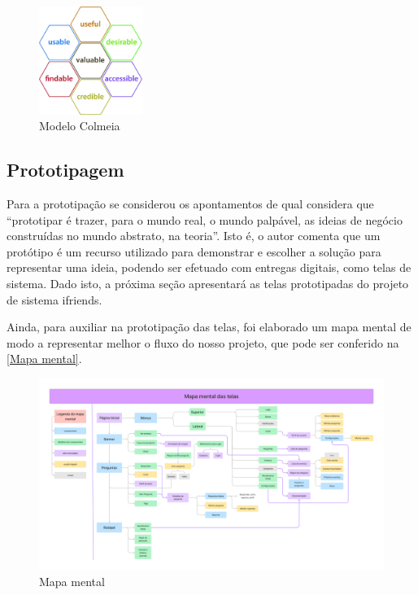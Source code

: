 \begin{figure}[htb]
\centering
\caption{\label{modelo colmeia} Modelo Colmeia}
\includegraphics[width=0.3\textwidth]{anexos/Imagens_Proposta/modelo_colmeia.jpg}
\end{figure}
\FloatBarrier

\subsection{Prototipagem}
Para a prototipação se considerou os apontamentos de  qual considera que ``prototipar é trazer, para o mundo real, o mundo palpável, as ideias de negócio construídas no mundo abstrato, na teoria''. Isto é, o autor comenta que um protótipo é um recurso utilizado para demonstrar e escolher a solução para representar uma ideia, podendo ser efetuado com entregas digitais, como telas de sistema. Dado isto, a próxima seção apresentará as telas prototipadas do projeto de sistema \gls{ifriends}.

Ainda, para auxiliar na prototipação das telas, foi elaborado um mapa mental de modo a representar melhor o fluxo do nosso projeto, que pode ser conferido na \autoref{Mapa mental}.

\begin{figure}[htb]
\centering
\caption{\label{Mapa mental} Mapa mental}
\includegraphics[width=1\textwidth]{anexos/Imagens_Prototipo/Mapa_Mental.png}
\end{figure}
\FloatBarrier


